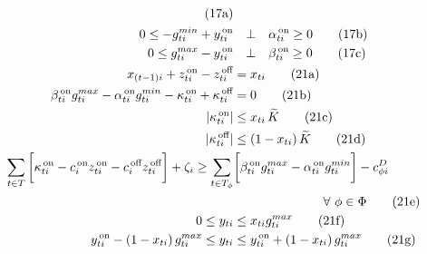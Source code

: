 \documentclass[9pt,a4paper]{article}
\newcommand{\on}{^{\,\text{on}}}
\newcommand{\off}{^{\,\text{off}}}
\begin{document}
\begin{subequations}
\begin{align}
	\tag{17a} \\
0 \leq - g^{min}_{ti} + y\on_{ti} &\quad \bot \quad \alpha\on_{ti} \geq 0 
	\tag{17b} \label{example:generator:KKT:min} \\
0 \leq g^{max}_{ti} - y\on_{ti} &\quad \bot \quad \beta\on_{ti} \geq 0 
	\tag{17c} \label{example:generator:KKT:max} \\
x_{(t-1)i} + z\on_{ti} - z\off_{ti} &= x_{ti} 
	\tag{21a} \label{example:BNE:generator:intertemporal} \\
\beta\on_{ti} g^{max}_{ti} - \alpha\on_{ti} g^{min}_{ti} - \kappa\on_{ti} + \kappa\off_{ti} &=0 
	\tag{21b} \label{example:BNE:generator:profits} \\
|\kappa\on_{ti}| &\leq x_{ti} \, \widetilde{K} 
	\tag{21c} \label{example:BNE:kappa_on} \\
|\kappa\off_{ti}| &\leq (1-x_{ti}) \, \widetilde{K} 
	\tag{21d} \label{example:BNE:kappa_off} \\
\sum_{t \in T} \bigg[\kappa\on_{ti}
- c\on_{i} z\on_{ti} -  c\off_{i} z\off_{ti}  \bigg] + \zeta_{i}
\geq \sum_{t \in T_\phi} &\bigg[\beta\on_{ti} g^{max}_{ti} - \alpha\on_{ti} g^{min}_{ti} \bigg]
- c^D_{\phi i} \quad \nonumber \\ 
& \hspace{2.5 cm} \forall~\phi \in \Phi 
	\tag{21e}\label{example:BNE:generator:incentive} \\
0 \leq y_{ti} &\leq x_{ti} g^{max}_{ti} 
	\tag{21f} \\
y\on_{ti} - (1-x_{ti}) \, g^{max}_{ti} \leq y_{ti} &\leq y\on_{ti} + (1-x_{ti}) \, g^{max}_{ti}
	\tag{21g} 
\end{align}
\end{subequations}
\end{document}
